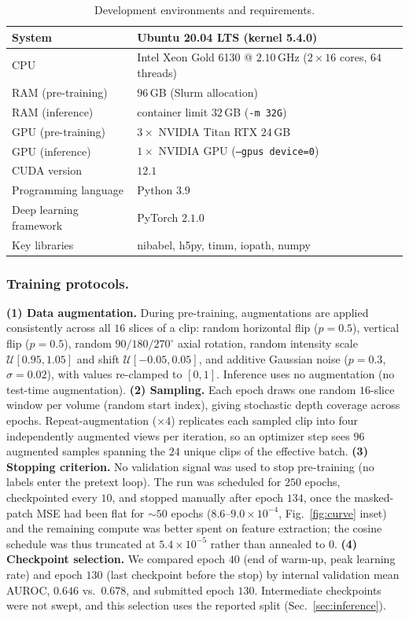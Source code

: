 \documentclass[runningheads]{llncs}
\begin{document}
\begin{table}[!htbp]
\caption{Development environments and requirements.}\label{table:env}
\centering
\begin{tabular}{ll}
\hline
System            & Ubuntu 20.04 LTS (kernel 5.4.0) \\ \hline
CPU               & Intel Xeon Gold 6130 @ $2.10$\,GHz ($2{\times}16$ cores, $64$ threads) \\ \hline
RAM (pre-training)& $96$\,GB (Slurm allocation) \\ \hline
RAM (inference)   & container limit $32$\,GB (\texttt{-m 32G}) \\ \hline
GPU (pre-training)& $3\times$ NVIDIA Titan RTX $24$\,GB \\ \hline
GPU (inference)   & $1\times$ NVIDIA GPU (\texttt{--gpus device=0}) \\ \hline
CUDA version      & $12.1$ \\ \hline
Programming language & Python $3.9$ \\ \hline
Deep learning framework & PyTorch $2.1.0$ \\ \hline
Key libraries     & nibabel, h5py, timm, iopath, numpy \\ \hline
\end{tabular}
\end{table}

\subsubsection{Training protocols.}
\label{sec:protocols}
\textbf{(1) Data augmentation.} During pre-training, augmentations are applied
consistently across all $16$ slices of a clip: random horizontal flip ($p{=}0.5$),
vertical flip ($p{=}0.5$), random $90/180/270^{\circ}$ axial rotation, random
intensity scale $\mathcal{U}[0.95,1.05]$ and shift $\mathcal{U}[-0.05,0.05]$, and
additive Gaussian noise ($p{=}0.3$, $\sigma{=}0.02$), with values re-clamped to
$[0,1]$. Inference uses no augmentation (no test-time augmentation).
\textbf{(2) Sampling.} Each epoch draws one random $16$-slice window per volume
(random start index), giving stochastic depth coverage across epochs.
Repeat-augmentation ($\times4$) replicates each sampled clip into four
independently augmented views per iteration, so an optimizer step sees $96$
augmented samples spanning the $24$ unique clips of the effective batch.
\textbf{(3) Stopping criterion.} No validation signal was used to stop
pre-training (no labels enter the pretext loop). The run was scheduled for $250$
epochs, checkpointed every $10$, and stopped manually after epoch $134$, once the
masked-patch MSE had been flat for ${\sim}50$ epochs ($8.6$--$9.0\times10^{-4}$,
Fig.~\ref{fig:curve} inset) and the remaining compute was better spent on
feature extraction; the cosine schedule was thus truncated at
$5.4\times10^{-5}$ rather than annealed to $0$.
\textbf{(4) Checkpoint selection.} We compared epoch $40$ (end of warm-up, peak
learning rate) and epoch $130$ (last checkpoint before the stop) by internal
validation mean AUROC, $0.646$ vs.\ $0.678$, and submitted epoch $130$.
Intermediate checkpoints were not swept, and this selection uses the reported
split (Sec.~\ref{sec:inference}).
\end{document}
